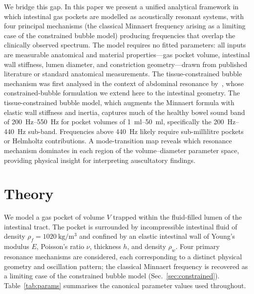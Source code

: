 \documentclass[review]{elsarticle}
\begin{document}
We bridge this gap.  In this paper we present a unified analytical framework
in which intestinal gas pockets are modelled as acoustically resonant systems,
with four principal mechanisms (the classical Minnaert frequency arising as a
limiting case of the constrained bubble model) producing frequencies that
overlap the clinically observed spectrum.  The model requires no fitted parameters: all inputs are
measurable anatomical and material properties---gas pocket volume, intestinal
wall stiffness, lumen diameter, and constriction geometry---drawn from
published literature or standard anatomical measurements.  The
tissue-constrained bubble mechanism was first analysed in the context of
abdominal resonance by~\cite{Mace2026gaspockets}, whose constrained-bubble
formulation we extend here to the intestinal geometry.  The
tissue-constrained bubble model, which augments the Minnaert formula with
elastic wall stiffness and inertia, captures much of the healthy bowel sound band
of \SIrange{200}{550}{\hertz} for pocket volumes of
\SIrange{1}{50}{\milli\litre}, specifically the \SIrange{200}{440}{\hertz}
sub-band.  Frequencies above \SI{440}{\hertz} likely require sub-millilitre
pockets or Helmholtz contributions.  A mode-transition map reveals which resonance
mechanism dominates in each region of the volume--diameter parameter space,
providing physical insight for interpreting auscultatory findings.

\section{Theory}
\label{sec:theory}

We model a gas pocket of volume $V$ trapped within the fluid-filled lumen of
the intestinal tract.  The pocket is surrounded by incompressible intestinal
fluid of density $\rho_f = \SI{1020}{\kilogram\per\metre\cubed}$ and confined
by an elastic intestinal wall of Young's modulus $E$, Poisson's ratio $\nu$,
thickness $h$, and density $\rho_w$.  Four primary resonance mechanisms are
considered, each corresponding to a distinct physical geometry and oscillation
pattern; the classical Minnaert frequency is recovered as a limiting case of
the constrained bubble model (Sec.~\ref{sec:constrained}).  Table~\ref{tab:params} summarises the canonical parameter values
used throughout.
\end{document}

